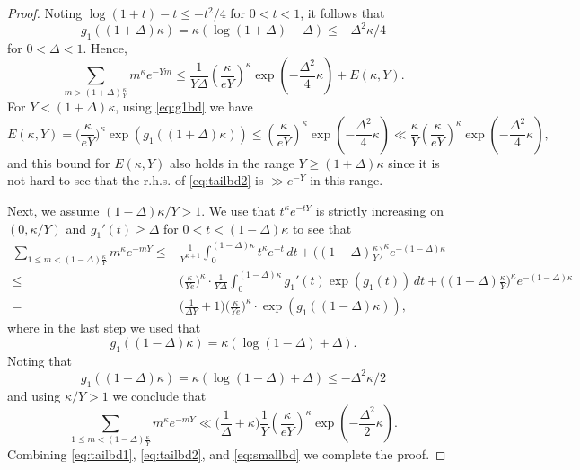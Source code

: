 \documentclass[12pt, a4paper]{amsart}
\theoremstyle{definition}
\newcommand {\1} {\mathbf{1}}
\numberwithin{equation}{section}
\begin{document}
\begin{proof}
Noting $\log (1+t)-t \le -t^2/4$ for $0<t<1$,
it follows that
\begin{equation} \label{eq:g1bd}
g_1((1+\Delta)\kappa)=\kappa(\log(1+\Delta)-\Delta) \le -\Delta^2\kappa/4
\end{equation}
for $0 < \Delta <1$.
Hence,
\begin{equation} \label{eq:tailbd1}
\sum_{m >(1+\Delta) \frac{\kappa}{Y}} m^{\kappa} e^{-Ym} \le \frac{1}{Y\Delta}  \left( \frac{\kappa}{e Y}\right)^{\kappa} \exp\left( -\frac{\Delta^2}{4} \kappa \right)+E(\kappa,Y).
\end{equation}
For $Y< (1+\Delta)\kappa$, using \eqref{eq:g1bd} we have
\begin{equation} \label{eq:tailbd2}
E(\kappa,Y) = \bigg(\frac{\kappa}{eY} \bigg)^{\kappa} \exp(g_1((1+\Delta)\kappa)) \le   \left( \frac{\kappa}{e Y}\right)^{\kappa} \exp\left( -\frac{\Delta^2}{4} \kappa \right) \ll \frac{\kappa }{Y} \left( \frac{\kappa}{e Y}\right)^{\kappa} \exp\left( -\frac{\Delta^2}{4} \kappa \right),
\end{equation}
and this bound for $E(\kappa,Y)$ also holds in the range $Y\ge (1+\Delta)\kappa $ since it is not hard to see that the r.h.s. of \eqref{eq:tailbd2} is $\gg e^{-Y}$ in this range.




Next, we assume $(1-\Delta)\kappa/Y > 1$.
We use that $t^{\kappa}e^{-tY}
$ is strictly increasing on $(0,\kappa/Y)$ and $g_1'(t)\ge \Delta$ for $0<t<(1-\Delta)\kappa$ to see that
\[
\begin{split}
\sum_{1 \le m < (1-\Delta)\frac{\kappa}{Y}} m^{\kappa} e^{-mY}
\le& \frac{1}{Y^{\kappa +1}}\int_0^{(1-\Delta)\kappa} t^{\kappa} e^{-t} \, dt+ \bigg((1-\Delta) \frac{\kappa}{Y} \bigg)^{\kappa} e^{-(1-\Delta)\kappa}\\
\le& \bigg( \frac{\kappa}{Ye}\bigg)^{\kappa} \cdot \frac{1}{Y\Delta} \int_0^{(1-\Delta)\kappa} g_1'(t) \exp(g_1(t)) \, dt+\bigg((1-\Delta) \frac{\kappa}{Y} \bigg)^{\kappa} e^{-(1-\Delta)\kappa}\\
=& \bigg(\frac{1}{\Delta Y}+1 \bigg) \bigg( \frac{\kappa}{Ye}\bigg)^{\kappa} \cdot  \exp(g_1((1-\Delta)\kappa)),
\end{split}
\]
where in the last step we used that
\[
g_1((1-\Delta)\kappa)=\kappa(\log(1-\Delta)+\Delta).
\]
Noting that \[g_1((1-\Delta)\kappa)=\kappa(\log (1-\Delta)+\Delta) \le -\Delta^2 \kappa/2\]
and using $\kappa/Y>1$ we conclude that
\begin{equation} \label{eq:smallbd}
\sum_{1 \le m < (1-\Delta)\frac{\kappa}{Y}} m^{\kappa} e^{-mY} \ll \bigg(\frac{1}{ \Delta } +\kappa\bigg)\frac{1}{Y}\left( \frac{\kappa}{e Y}\right)^{\kappa} \exp\left( -\frac{\Delta^2}{2} \kappa \right).
\end{equation}
Combining \eqref{eq:tailbd1}, \eqref{eq:tailbd2}, and \eqref{eq:smallbd} we complete the proof.
\end{proof}
\end{document}
